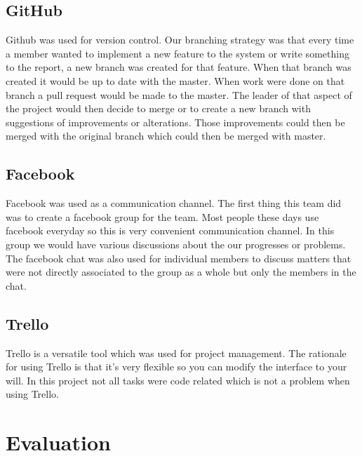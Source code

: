 \documentclass[11pt]{article}
\begin{document}
\subsection{GitHub}
Github was used for version control. Our branching strategy was that every time a member wanted to implement a new feature to the system or write something to the report, a new branch was created for that feature. When that branch was created it would be up to date with the master. When work were done on that branch a pull request would be made to the master. The leader of that aspect of the project would then decide to merge or to create a new branch with suggestions of improvements or alterations. Those improvements could then be merged with the original branch which could then be merged with master.
\subsection{Facebook}
Facebook was used as a communication channel. The first thing this team did was to create a facebook group for the team. Most people these days use facebook everyday so this is very convenient communication channel. In this group we would have various discussions about the our progresses or problems. The facebook chat was also used for individual members to discuss matters that were not directly associated to the group as a whole but only the members in the chat.
\subsection{Trello}
Trello is a versatile tool which was used for project management. The rationale for using Trello is that it's very flexible so you can modify the interface to your will. In this project not all tasks were code related which is not a problem when using Trello. 


\newpage
\section{Evaluation}
\end{document}
